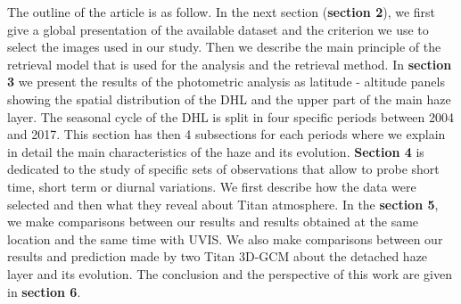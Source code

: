 The outline of the article is as follow. In the next section (\textbf{section 2}), we first give a global presentation of
the available dataset and the criterion we use to select the images used in our study.
Then we describe the main principle of the retrieval model that is used for the analysis and the retrieval method.
In \textbf{section 3} we present the results of the photometric analysis as latitude -
altitude panels showing the spatial distribution of the DHL and the upper part of the main haze layer.
The seasonal cycle of the DHL is split in four specific periods between 2004 and 2017.
This section has then 4 subsections for each periods where we explain in detail the main characteristics of the haze and
its evolution.
\textbf{Section 4} is dedicated to the study of specific sets of observations that allow to probe short time,
short term or diurnal variations. We first describe how the data were selected and then what they reveal about Titan atmosphere.
In the \textbf{section 5}, we make comparisons between our results and results obtained at the same location and the same time with UVIS.
We also make comparisons between our results and prediction made by two Titan 3D-GCM about the detached haze layer and its evolution.
The conclusion and the perspective of this work are given in \textbf{section 6}.
